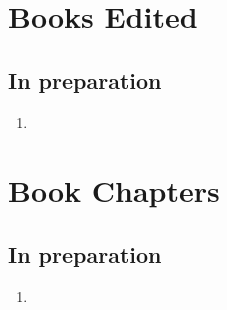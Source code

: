\section*{Books Edited}


\subsection*{In preparation}

\begin{enumerate}
    \item {}
\end{enumerate}

\section*{Book Chapters}


\subsection*{In preparation}

\begin{enumerate}
    \item {}
\end{enumerate}


